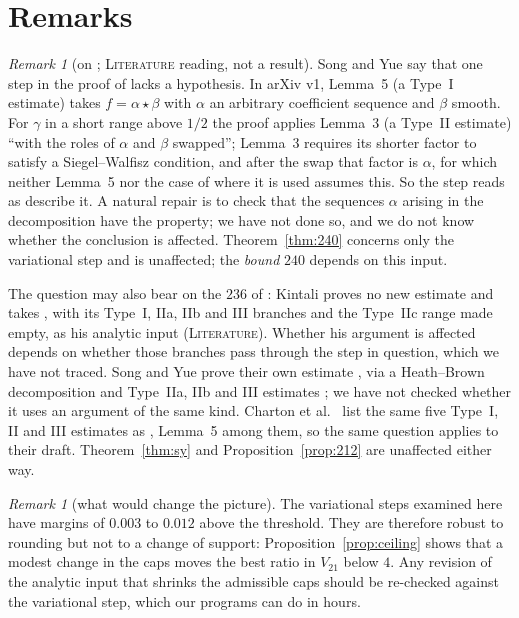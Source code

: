 \documentclass[11pt]{amsart}
\theoremstyle{definition}
\theoremstyle{remark}
\newtheorem{remark}[theorem]{Remark}
\newcommand{\lbl}[1]{\textup{\textsc{#1}}}
\begin{document}
\section{Remarks}

\begin{remark}[on {\cite[Lemma~5]{Sta26}}; \lbl{Literature} reading, not a result]\label{rem:lemma5}
Song and Yue \cite[Remark~4.23]{SY26} say that one step in the proof of
\cite[Lemma~5]{Sta26} lacks a hypothesis. In arXiv v1, Lemma~5 (a Type~I
estimate) takes $f=\alpha\star\beta$ with $\alpha$ an arbitrary
coefficient sequence and $\beta$ smooth. For $\gamma$ in a short range above
$1/2$ the proof applies Lemma~3 (a Type~II estimate) ``with the roles of
$\alpha$ and $\beta$ swapped''; Lemma~3 requires its shorter factor to satisfy
a Siegel--Walfisz condition, and after the swap that factor is $\alpha$, for
which neither Lemma~5 nor the case of \cite[Definition~9]{Sta26} where it is
used assumes this. So the step reads as \cite{SY26} describe it. A natural
repair is to check that the sequences $\alpha$ arising in the decomposition
have the property; we have not done so, and we do not know whether the
conclusion is affected. Theorem~\ref{thm:240} concerns only the variational
step and is unaffected; the \emph{bound} $240$ depends on this input.

The question may also bear on the $236$ of \cite{Kin26}: Kintali proves no
new estimate and takes \cite[Prop.~3]{Sta26}, with its Type~I, IIa, IIb and
III branches and the Type~IIc range made empty, as his analytic input
(\lbl{Literature}). Whether his argument is affected depends on whether those
branches pass through the step in question, which we have not traced. Song
and Yue prove their own estimate \cite[Thm.~4.18]{SY26}, via a Heath--Brown
decomposition and Type~IIa, IIb and III estimates
\cite[\S\S4.2--4.7]{SY26}; we have not checked whether it uses an argument of
the same kind. Charton et al.\ \cite{Cha26} list the same five Type~I, II and
III estimates as \cite{Sta26}, Lemma~5 among them, so the same question
applies to their draft. Theorem~\ref{thm:sy} and
Proposition~\ref{prop:212} are unaffected either way.
\end{remark}

\begin{remark}[what would change the picture]
The variational steps examined here have margins of $0.003$ to $0.012$ above
the threshold. They are therefore robust to rounding but not to a change of
support: Proposition~\ref{prop:ceiling} shows that a modest change in the caps
moves the best ratio in $V_{21}$ below $4$. Any revision of the analytic input
that shrinks the admissible caps should be re-checked against the variational
step, which our programs can do in hours.
\end{remark}
\end{document}
